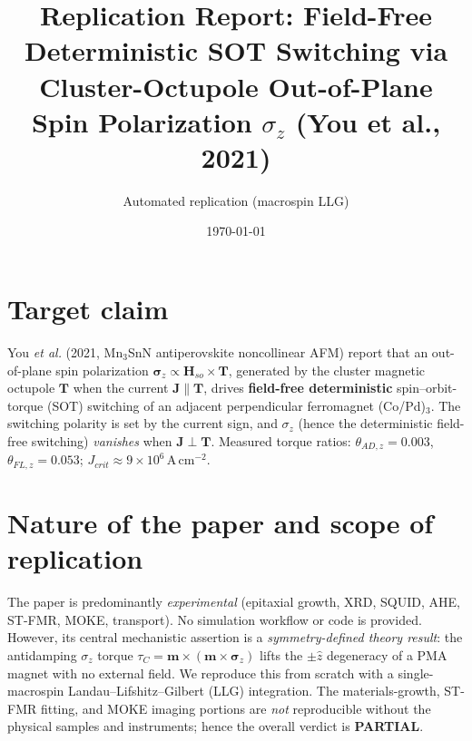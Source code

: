 \documentclass[11pt]{article}
\title{Replication Report: Field-Free Deterministic SOT Switching via\\
Cluster-Octupole Out-of-Plane Spin Polarization $\sigma_z$ (You et al., 2021)}
\author{Automated replication (macrospin LLG)}
\date{\today}
\begin{document}
\maketitle

\section{Target claim}
You \emph{et al.} (2021, Mn$_3$SnN antiperovskite noncollinear AFM) report that an
out-of-plane spin polarization $\boldsymbol{\sigma}_z\propto\mathbf{H}_{so}\times\mathbf{T}$,
generated by the cluster magnetic octupole $\mathbf{T}$ when the current $\mathbf{J}\parallel\mathbf{T}$,
drives \textbf{field-free deterministic} spin--orbit-torque (SOT) switching of an adjacent
perpendicular ferromagnet (Co/Pd)$_3$. The switching polarity is set by the current sign,
and $\sigma_z$ (hence the deterministic field-free switching) \emph{vanishes} when
$\mathbf{J}\perp\mathbf{T}$. Measured torque ratios: $\theta_{AD,z}=0.003$, $\theta_{FL,z}=0.053$;
$J_{crit}\approx 9\times10^{6}\,\mathrm{A\,cm^{-2}}$.

\section{Nature of the paper and scope of replication}
The paper is predominantly \emph{experimental} (epitaxial growth, XRD, SQUID, AHE,
ST-FMR, MOKE, transport). No simulation workflow or code is provided. However, its
central mechanistic assertion is a \emph{symmetry-defined theory result}: the antidamping
$\sigma_z$ torque $\tau_C=\mathbf{m}\times(\mathbf{m}\times\boldsymbol{\sigma}_z)$ lifts the
$\pm\hat z$ degeneracy of a PMA magnet with no external field. We reproduce this
from scratch with a single-macrospin Landau--Lifshitz--Gilbert (LLG) integration.
The materials-growth, ST-FMR fitting, and MOKE imaging portions are \emph{not}
reproducible without the physical samples and instruments; hence the overall verdict is
\textbf{PARTIAL}.
\end{document}
